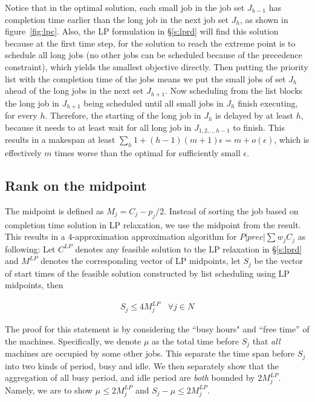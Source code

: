 Notice that in the optimal solution, each small job in the job set $J_{h-1}$ has completion time earlier than the long job in the next job set $J_h$, as shown in figure~\ref{fig:lpc}. Also, the LP formulation in \S\ref{s:lprd} will find this solution because at the first time step, for the solution to reach the extreme point is to schedule all long jobs (no other jobs can be scheduled because of the precedence constraint), which yields the smallest objective directly. Then putting the priority list with the completion time of the jobs means we put the small jobs of set $J_h$ ahead of the long jobs in the next set $J_{h+1}$. Now scheduling from the list blocks the long job in $J_{h+1}$ being scheduled until all small jobs in $J_h$ finish executing, for every $h$. Therefore, the starting of the long job in $J_h$ is delayed by at least $h$, because it needs to at least wait for all long job in $J_{1, 2,.., h-1}$ to finish. This results in a makespan at least $\sum_h 1 + (h-1)(m+1)\epsilon = m + o(\epsilon)$, which is effectively $m$ times worse than the optimal for sufficiently small $\epsilon$.

\subsection{Rank on the midpoint} \label{s:lpm}
The midpoint is defined as $M_j = C_j - p_j/2$. Instead of sorting the job based on completion time solution in LP relaxation, we use the midpoint from the result. This results in a 4-approximation approximation algorithm for $P|prec|\sum w_jC_j$ as following: Let $C^{LP}$ denotes any feasible solution to the LP relaxation in \S\ref{s:lprd} and $M^{LP}$ denotes the corresponding vector of LP midpoints, let $S_j$ be the vector of start times of the feasible solution constructed by list scheduling using LP midpoints, then

\begin{align}
S_j \leq 4 M^{LP}_j \:\:\:\: \forall j \in N
\end{align}

The proof for this statement is by considering the ``busy hours" and ``free time'' of the machines. Specifically, we denote $\mu$ as the total time before $S_j$ that \emph{all} machines are occupied by some other jobs. This separate the time span before $S_j$ into two kinds of period, busy and idle. We then separately show that the aggregation of all busy period, and idle period are \emph{both} bounded by $2M^{LP}_j$. Namely, we are to show $\mu \leq 2 M^{LP}_j$ and  $S_j - \mu \leq 2 M^{LP}_j$.

